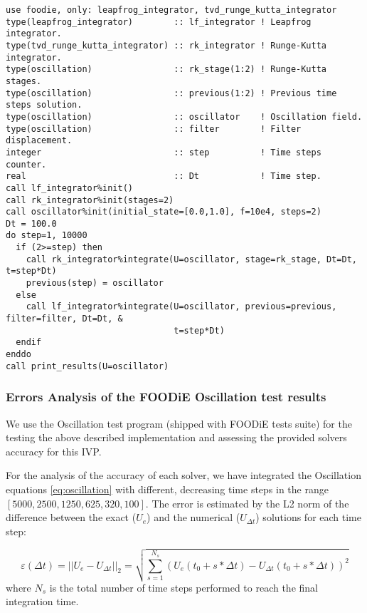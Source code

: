 \documentclass[pdftex,preprint,3p,times,numbers]{elsarticle}
\begin{document}
\begin{lstlisting}[firstnumber=1,style=code,caption={numerical integration of the \emph{oscillation} system by means of Leapfrog RAW-filtered method},label={list:oscillation_leapfrog}]
use foodie, only: leapfrog_integrator, tvd_runge_kutta_integrator
type(leapfrog_integrator)        :: lf_integrator ! Leapfrog integrator.
type(tvd_runge_kutta_integrator) :: rk_integrator ! Runge-Kutta integrator.
type(oscillation)                :: rk_stage(1:2) ! Runge-Kutta stages.
type(oscillation)                :: previous(1:2) ! Previous time steps solution.
type(oscillation)                :: oscillator    ! Oscillation field.
type(oscillation)                :: filter        ! Filter displacement.
integer                          :: step          ! Time steps counter.
real                             :: Dt            ! Time step.
call lf_integrator%init()
call rk_integrator%init(stages=2)
call oscillator%init(initial_state=[0.0,1.0], f=10e4, steps=2)
Dt = 100.0
do step=1, 10000
  if (2>=step) then
    call rk_integrator%integrate(U=oscillator, stage=rk_stage, Dt=Dt, t=step*Dt)
    previous(step) = oscillator
  else
    call lf_integrator%integrate(U=oscillator, previous=previous, filter=filter, Dt=Dt, &
                                 t=step*Dt)
  endif
enddo
call print_results(U=oscillator)
\end{lstlisting}

\subsubsection{Errors Analysis of the FOODiE Oscillation test results}

We use the Oscillation test program (shipped with FOODiE tests suite) for the testing the above described implementation and assessing the provided solvers accuracy for this IVP.

For the analysis of the accuracy of each solver, we have integrated the Oscillation equations \ref{eq:oscillation} with different, decreasing time steps in the range $[5000, 2500, 1250, 625, 320, 100]$. The error is estimated by the L2 norm of the difference between the exact ($U_e$) and the numerical ($U_{\Delta t}$) solutions for each time step:

\begin{equation}
  \varepsilon (\Delta t) = || U_e - U_{\Delta t} ||_2 = \sqrt{ \sum_{s=1}^{N_s} { \left(U_e(t_0 + s * \Delta t) - U_{\Delta t}(t_0 + s * \Delta t) \right)^2 }}
\label{eq:oscillation-error}
\end{equation}
where $N_s$ is the total number of time steps performed to reach the final integration time.
\end{document}
